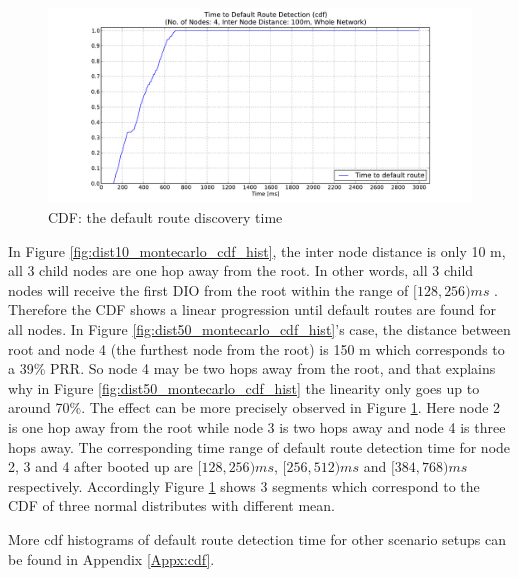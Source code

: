 \begin{figure}[htbp]
  \begin{center}
    \leavevmode
      \includegraphics[width=\textwidth]
      {Pics/results/4/MRHOF/line/dist100_montecarlo_cdf_hist.pdf}
   \caption{CDF: the default route discovery time}
    \label{fig:dist100_montecarlo_cdf_hist}
  \end{center}
\end{figure}

In Figure \ref{fig:dist10_montecarlo_cdf_hist}, the inter node distance is only 10 m, all 3 child nodes are one hop away from the root. In other words, all 3 child nodes will receive the first DIO from the root within the range of $[128, 256) ms$ . Therefore the CDF shows a linear progression until default routes are found for all nodes. In Figure \ref{fig:dist50_montecarlo_cdf_hist}\@'s case, the distance between root and node 4 (the furthest node from the root) is 150 m which corresponds to a 39\% PRR. So node 4 may be two hops away from the root, and that explains why in Figure \ref{fig:dist50_montecarlo_cdf_hist} the linearity only goes up to around 70\%. The effect can be more precisely observed in Figure \ref{fig:dist100_montecarlo_cdf_hist}. Here node 2 is one hop away from the root while node 3 is two hops away and node 4 is three hops away. The corresponding time range of default route detection time for node 2, 3 and 4 after booted up are $[128, 256) ms$, $[256, 512) ms$ and $[384, 768) ms$ respectively. Accordingly Figure \ref{fig:dist100_montecarlo_cdf_hist} shows 3 segments which correspond to the CDF of three normal distributes with different mean.
\newline

More cdf histograms of default route detection time for other scenario setups can be found in Appendix \ref{Appx:cdf}. 


